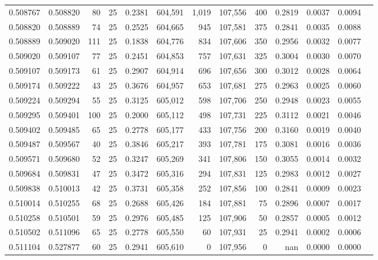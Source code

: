\begin{tabular}{rrrrrrrrrrrrr}
0.508767 & 0.508820 &  80 &  25 &                                     0.2381 & 604,591 &   1,019 & 107,556 &     400 & 0.2819 & 0.0037 & 0.0094 \\
0.508820 & 0.508889 &  74 &  25 &                                     0.2525 & 604,665 &     945 & 107,581 &     375 & 0.2841 & 0.0035 & 0.0088 \\
0.508889 & 0.509020 & 111 &  25 &                                     0.1838 & 604,776 &     834 & 107,606 &     350 & 0.2956 & 0.0032 & 0.0077 \\
0.509020 & 0.509107 &  77 &  25 &                                     0.2451 & 604,853 &     757 & 107,631 &     325 & 0.3004 & 0.0030 & 0.0070 \\
0.509107 & 0.509173 &  61 &  25 &                                     0.2907 & 604,914 &     696 & 107,656 &     300 & 0.3012 & 0.0028 & 0.0064 \\
0.509174 & 0.509222 &  43 &  25 &                                     0.3676 & 604,957 &     653 & 107,681 &     275 & 0.2963 & 0.0025 & 0.0060 \\
0.509224 & 0.509294 &  55 &  25 &                                     0.3125 & 605,012 &     598 & 107,706 &     250 & 0.2948 & 0.0023 & 0.0055 \\
0.509295 & 0.509401 & 100 &  25 &                                     0.2000 & 605,112 &     498 & 107,731 &     225 & 0.3112 & 0.0021 & 0.0046 \\
0.509402 & 0.509485 &  65 &  25 &                                     0.2778 & 605,177 &     433 & 107,756 &     200 & 0.3160 & 0.0019 & 0.0040 \\
0.509487 & 0.509567 &  40 &  25 &                                     0.3846 & 605,217 &     393 & 107,781 &     175 & 0.3081 & 0.0016 & 0.0036 \\
0.509571 & 0.509680 &  52 &  25 &                                     0.3247 & 605,269 &     341 & 107,806 &     150 & 0.3055 & 0.0014 & 0.0032 \\
0.509684 & 0.509831 &  47 &  25 &                                     0.3472 & 605,316 &     294 & 107,831 &     125 & 0.2983 & 0.0012 & 0.0027 \\
0.509838 & 0.510013 &  42 &  25 &                                     0.3731 & 605,358 &     252 & 107,856 &     100 & 0.2841 & 0.0009 & 0.0023 \\
0.510014 & 0.510255 &  68 &  25 &                                     0.2688 & 605,426 &     184 & 107,881 &      75 & 0.2896 & 0.0007 & 0.0017 \\
0.510258 & 0.510501 &  59 &  25 &                                     0.2976 & 605,485 &     125 & 107,906 &      50 & 0.2857 & 0.0005 & 0.0012 \\
0.510502 & 0.511096 &  65 &  25 &                                     0.2778 & 605,550 &      60 & 107,931 &      25 & 0.2941 & 0.0002 & 0.0006 \\
0.511104 & 0.527877 &  60 &  25 &                                     0.2941 & 605,610 &       0 & 107,956 &       0 &    nan & 0.0000 & 0.0000 \\
\bottomrule
\end{tabular}
